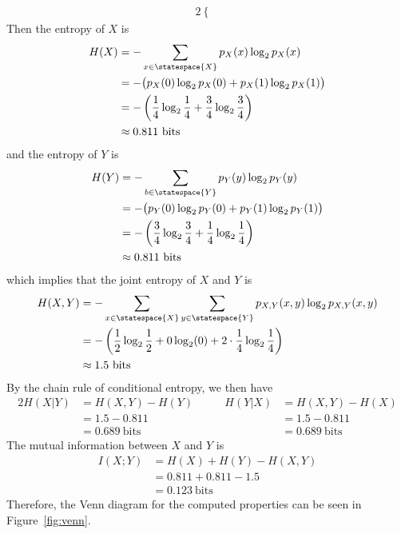 \documentclass[
  coursecode={MTHE 474},
  assignmentname={Homework \homeworknumber},
  studentnumber=20053722,
  name={Bryan Hoang},
  draft,
]{
  ltxanswer%
}
\begin{document}
\begin{questions}
\begin{solution}
\begin{alignat*}{2}
\begin{cases}
                                                  \end{cases}
      \end{alignat*}
      Then the entropy of \(X\) is
      \begin{align*}
        H(X) &= -\sum_{x\in\statespace{X}} p_{X}(x) \log_{2} p_{X}(x)                         \\
             &= -\big(p_{X}(0)\log_{2}p_{X}(0) + p_{X}(1)\log_{2}p_{X}(1)\big)                \\
             &= -\left(\frac{1}{4}\log_{2}\frac{1}{4} + \frac{3}{4}\log_{2}\frac{3}{4}\right) \\
             &\approx 0.811\ \text{bits}
      \end{align*}
      and the entropy of \(Y\) is
      \begin{align*}
        H(Y) &= -\sum_{b\in\statespace{Y}} p_{Y}(y) \log_{2} p_{Y}(y)                         \\
             &= -\big(p_{Y}(0)\log_{2}p_{Y}(0) + p_{Y}(1)\log_{2}p_{Y}(1)\big)                \\
             &= -\left(\frac{3}{4}\log_{2}\frac{3}{4} + \frac{1}{4}\log_{2}\frac{1}{4}\right) \\
             &\approx 0.811\ \text{bits}
      \end{align*}
      which implies that the joint entropy of \(X\) and \(Y\) is
      \begin{align*}
        H(X,Y) &= -\sum_{x\in\statespace{X}}\sum_{y\in\statespace{Y}} p_{X,Y}(x,y) \log_{2}p_{X,Y}(x,y)               \\
               &= -\left(\frac{1}{2}\log_{2}\frac{1}{2} + 0\log_{2}(0) + 2\cdot \frac{1}{4}\log_{2}\frac{1}{4}\right) \\
               &\approx 1.5\ \text{bits}
      \end{align*}
      By the chain rule of conditional entropy, we then have
      \begin{alignat*}{2}
        H(X|Y) &= H(X,Y) - H(Y)      &\qquad H(Y|X) &= H(X,Y) - H(X)      \\
               &= 1.5 - 0.811        &              &= 1.5 - 0.811        \\
               &= 0.689\ \text{bits} &              &= 0.689\ \text{bits}
      \end{alignat*}
      The mutual information between \(X\) and \(Y\) is
      \begin{align*}
        I(X;Y) &= H(X) + H(Y) - H(X,Y) \\
               &= 0.811 + 0.811 - 1.5  \\
               &= 0.123\ \text{bits}
      \end{align*}
      Therefore, the Venn diagram for the computed properties can be seen in Figure~\ref{fig:venn}.
      \begin{answerfigure}
\end{answerfigure}
\end{solution}
\end{questions}
\end{document}
